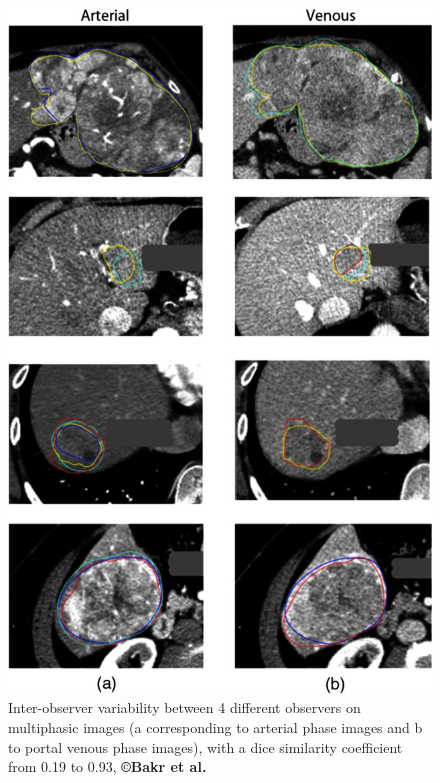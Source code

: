 \documentclass[]{article}
\begin{document}
\begin{figure}[th!]
	\centering
	\includegraphics[width=0.7\linewidth]{images/image14}
	\caption{Inter-observer variability between 4 different observers on multiphasic images (a corresponding to arterial phase images and b to portal venous phase images), with a dice similarity coefficient from 0.19 to 0.93, \textbf{©Bakr et al.} \cite{Bakr2017}}
	\label{Bakr_Fig2}
\end{figure}
\end{document}

